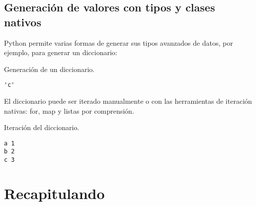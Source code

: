 \subsection{Generación de valores con tipos y clases nativos}

Python permite varias formas de generar sus tipos avanzados de datos,
por ejemplo, para generar un diccionario:\\

\begin{code} Generación de un diccionario.
\begin{Shaded}
\begin{Highlighting}[]
\OperatorTok{=}\NormalTok{ \{}\NormalTok{:}\NormalTok{, }\NormalTok{:}\NormalTok{, }\NormalTok{:}\NormalTok{\}}
\OperatorTok{=} 
\end{Highlighting}
\end{Shaded}

\begin{Shaded}
\begin{Highlighting}[]
\end{Highlighting}
\end{Shaded}

\begin{verbatim}
'c'

\end{verbatim}
\end{code}

El diccionario puede ser iterado manualmente o con las herramientas de
iteración nativas: for, map y listas por comprensión.

\begin{code} Iteración del diccionario.
\begin{Shaded}
\begin{Highlighting}[]
\end{Highlighting}
\end{Shaded}

\begin{verbatim}
a 1
b 2
c 3
\end{verbatim}
\end{code}

\section{Recapitulando}

